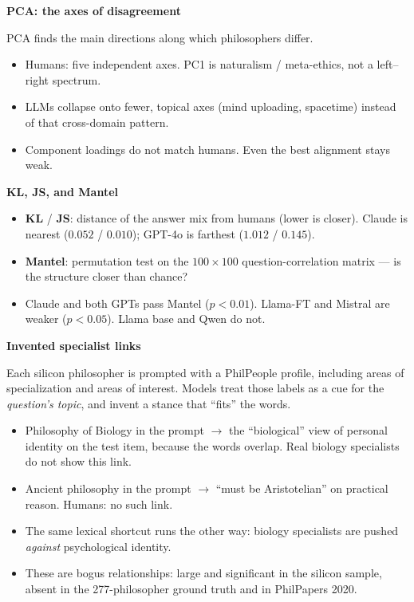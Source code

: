 \documentclass[a0paper,fleqn]{betterposter}
\renewcommand{\fontsizesection}{\fontsize{30}{36}\selectfont}
\renewcommand{\section}[1]{%
\par\vspace{0.55em}%
{\fontsizesection\selectfont\textbf{#1}}\par\vspace{0.22em}%
}
\newcommand{\metric}[1]{\textbf{#1}}
\begin{document}
{\section{PCA: the axes of disagreement}
PCA finds the main directions along
which philosophers differ.

\begin{itemize}
\item Humans: five independent axes.
PC1 is naturalism / meta-ethics,
not a left--right spectrum.
\item LLMs collapse onto fewer, topical
axes (mind uploading, spacetime)
instead of that cross-domain
pattern.
\item Component loadings do not match
humans. Even the best alignment
stays weak.
\end{itemize}

\section{KL, JS, and Mantel}
\begin{itemize}
\item \metric{KL} / \metric{JS}: distance of the
answer mix from humans (lower is
closer). Claude is nearest
($0.052$ / $0.010$); GPT-4o is
farthest ($1.012$ / $0.145$).
\item \metric{Mantel}: permutation test on
the $100\times 100$ question-correlation
matrix --- is the structure closer
than chance?
\item Claude and both GPTs pass Mantel
($p<0.01$). Llama-FT and Mistral
are weaker ($p<0.05$). Llama base
and Qwen do not.
\end{itemize}

\section{Invented specialist links}
Each silicon philosopher is prompted
with a PhilPeople profile, including
areas of specialization and areas of
interest. Models treat those labels
as a cue for the \emph{question's
topic}, and invent a stance that
``fits'' the words.

\begin{itemize}
\item Philosophy of Biology in the
prompt $\to$ the ``biological'' view
of personal identity on the test
item, because the words overlap.
Real biology specialists do not
show this link.
\item Ancient philosophy in the prompt
$\to$ ``must be Aristotelian'' on
practical reason. Humans: no such
link.
\item The same lexical shortcut runs
the other way: biology specialists
are pushed \emph{against}
psychological identity.
\item These are bogus relationships:
large and significant in the
silicon sample, absent in the
277-philosopher ground truth and
in PhilPapers 2020.
\end{itemize}

}
\end{document}
